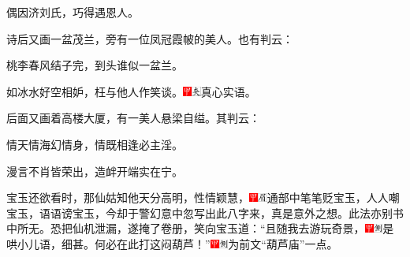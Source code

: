 偶因济刘氏，巧得遇恩人。

诗后又画一盆茂兰，旁有一位凤冠霞帔的美人。也有判云：

桃李春风结子完，到头谁似一盆兰。

如冰水好空相妒，枉与他人作笑谈。{\includegraphics[width=3mm]{../Images/00002}\includegraphics[width=3mm]{../Images/00012}\footnotesize \kaishu 真心实语。}

后面又画着高楼大厦，有一美人悬梁自缢。其判云：

情天情海幻情身，情既相逢必主淫。

漫言不肖皆荣出，造衅开端实在宁。

宝玉还欲看时，那仙姑知他天分高明，性情颖慧，{\includegraphics[width=3mm]{../Images/00002}\includegraphics[width=3mm]{../Images/00010}\footnotesize \kaishu 通部中笔笔贬宝玉，人人嘲宝玉，语语谤宝玉，今却于警幻意中忽写出此八字来，真是意外之想。此法亦别书中所无。}恐把仙机泄漏，遂掩了卷册，笑向宝玉道：“且随我去游玩奇景，{\includegraphics[width=3mm]{../Images/00002}\includegraphics[width=3mm]{../Images/00011}\footnotesize \kaishu 是哄小儿语，细甚。}何必在此打这闷葫芦！”{\includegraphics[width=3mm]{../Images/00002}\includegraphics[width=3mm]{../Images/00011}\footnotesize \kaishu 为前文“葫芦庙”一点。}

